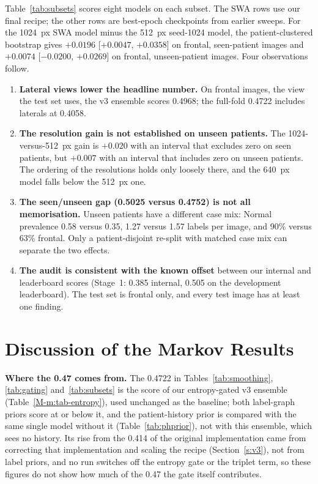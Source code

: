 \documentclass[conference]{IEEEtran}
\begin{document}
Table~\ref{tab:subsets} scores eight models on each subset. The SWA rows use our final recipe; the other rows are best-epoch checkpoints from earlier sweeps. For the 1024~px SWA model minus the 512~px seed-1024 model, the patient-clustered bootstrap gives $+0.0196$ [$+0.0047$, $+0.0358$] on frontal, seen-patient images and $+0.0074$ [$-0.0200$, $+0.0269$] on frontal, unseen-patient images. Four observations follow.
\begin{enumerate}
\item \textbf{Lateral views lower the headline number.} On frontal images, the view the test set uses, the v3 ensemble scores 0.4968; the full-fold 0.4722 includes laterals at 0.4058.
\item \textbf{The resolution gain is not established on unseen patients.} The 1024-versus-512~px gain is $+0.020$ with an interval that excludes zero on seen patients, but $+0.007$ with an interval that includes zero on unseen patients. The ordering of the resolutions holds only loosely there, and the 640~px model falls below the 512~px one.
\item \textbf{The seen/unseen gap (0.5025 versus 0.4752) is not all memorisation.} Unseen patients have a different case mix: Normal prevalence 0.58 versus 0.35, 1.27 versus 1.57 labels per image, and 90\% versus 63\% frontal. Only a patient-disjoint re-split with matched case mix can separate the two effects.
\item \textbf{The audit is consistent with the known offset} between our internal and leaderboard scores (Stage~1: 0.385 internal, 0.505 on the development leaderboard). The test set is frontal only, and every test image has at least one finding.
\end{enumerate}


\section{Discussion of the Markov Results}
\label{s:disc}
\textbf{Where the 0.47 comes from.} The 0.4722 in Tables~\ref{tab:smoothing}, \ref{tab:gating} and~\ref{tab:subsets} is the score of our entropy-gated v3 ensemble (Table~\ref{M-m:tab-entropy}), used unchanged as the baseline; both label-graph priors score at or below it, and the patient-history prior is compared with the same single model without it (Table~\ref{tab:phprior}), not with this ensemble, which sees no history. Its rise from the 0.414 of the original implementation came from correcting that implementation and scaling the recipe (Section~\ref{s:v3}), not from label priors, and no run switches off the entropy gate or the triplet term, so these figures do not show how much of the 0.47 the gate itself contributes.
\end{document}
